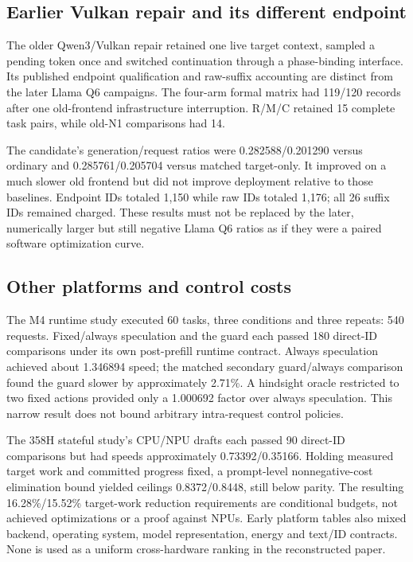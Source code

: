 \subsection{Earlier Vulkan repair and its different endpoint}
The older Qwen3/Vulkan repair retained one live target context, sampled a pending token once and switched continuation through a phase-binding interface. Its published endpoint qualification and raw-suffix accounting are distinct from the later Llama Q6 campaigns. The four-arm formal matrix had 119/120 records after one old-frontend infrastructure interruption. R/M/C retained 15 complete task pairs, while old-N1 comparisons had 14.

The candidate's generation/request ratios were 0.282588/0.201290 versus ordinary and 0.285761/0.205704 versus matched target-only. It improved on a much slower old frontend but did not improve deployment relative to those baselines. Endpoint IDs totaled 1,150 while raw IDs totaled 1,176; all 26 suffix IDs remained charged. These results must not be replaced by the later, numerically larger but still negative Llama Q6 ratios as if they were a paired software optimization curve.

\subsection{Other platforms and control costs}
The M4 runtime study executed 60 tasks, three conditions and three repeats: 540 requests. Fixed/always speculation and the guard each passed 180 direct-ID comparisons under its own post-prefill runtime contract. Always speculation achieved about 1.346894 speed; the matched secondary guard/always comparison found the guard slower by approximately 2.71\%. A hindsight oracle restricted to two fixed actions provided only a 1.000692 factor over always speculation. This narrow result does not bound arbitrary intra-request control policies.

The 358H stateful study's CPU/NPU drafts each passed 90 direct-ID comparisons but had speeds approximately 0.73392/0.35166. Holding measured target work and committed progress fixed, a prompt-level nonnegative-cost elimination bound yielded ceilings 0.8372/0.8448, still below parity. The resulting 16.28\%/15.52\% target-work reduction requirements are conditional budgets, not achieved optimizations or a proof against NPUs. Early platform tables also mixed backend, operating system, model representation, energy and text/ID contracts. None is used as a uniform cross-hardware ranking in the reconstructed paper.
